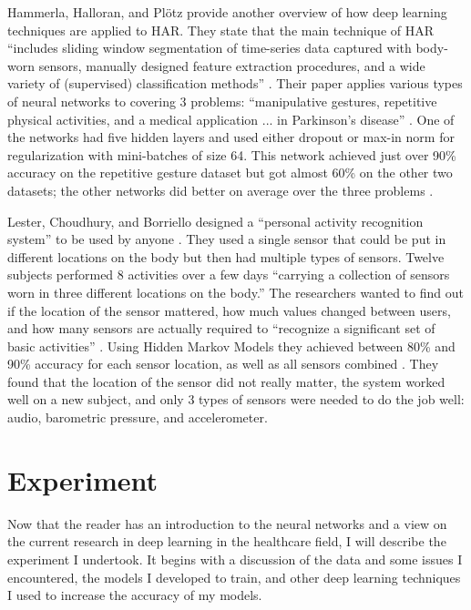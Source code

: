 \documentclass[]{report}
\begin{document}
Hammerla, Halloran, and Plötz provide another overview of how deep learning techniques are applied to HAR. They state that the main technique of HAR ``includes sliding window segmentation of time-series data captured with body-worn sensors, manually designed feature extraction procedures, and a wide variety of (supervised) classification methods'' \cite{Hammerla}. Their paper applies various types of neural networks to covering 3 problems: ``manipulative gestures, repetitive physical activities, and a medical application ... in Parkinson’s disease'' \cite{Hammerla}. One of the networks had five hidden layers and used either dropout or max-in norm for regularization with mini-batches of size 64. This network achieved just over 90\% accuracy on the repetitive gesture dataset but got almost 60\% on the other two datasets; the other networks did better on average over the three problems \cite{Hammerla}.

Lester, Choudhury, and Borriello designed a ``personal activity recognition system'' to be used by anyone \cite{Lester2006}. They used a single sensor that could be put in different locations on the body but then had multiple types of sensors. Twelve subjects performed 8 activities over a few days ``carrying a collection of sensors worn in three different locations on the body.'' The researchers wanted to find out if the location of the sensor mattered, how much values changed between users, and how many sensors are actually required to ``recognize a significant set of basic activities'' \cite{Lester2006}.
Using Hidden Markov Models they achieved between 80\% and 90\% accuracy for each sensor location, as well as all sensors combined \cite{Bulling}. They found that the location of the sensor did not really matter, the system worked well on a new subject, and only 3 types of sensors were needed to do the job well: audio, barometric pressure, and accelerometer.


\chapter{Experiment}

Now that the reader has an introduction to the neural networks and a view on the current research in deep learning in the healthcare field, I will describe the experiment I undertook. It begins with a discussion of the data and some issues I encountered, the models I developed to train, and other deep learning techniques I used to increase the accuracy of my models.
\end{document}
